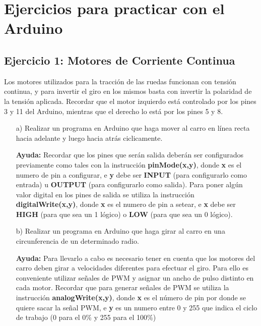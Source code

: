 \documentclass[a4paper,11pt]{article}
\begin{document}
 


\section{Ejercicios para practicar con el Arduino}

\subsection*{Ejercicio 1: Motores de Corriente Continua}Los motores utilizados para la tracción de las ruedas funcionan con tensión continua, y para invertir el giro en los mismos basta con invertir la polaridad de la tensión aplicada. Recordar que el motor izquierdo
está controlado por los pines 3 y 11 del Arduino, mientras que el derecho lo está por los pines 5 y 8.
\begin{itemize}
		\item[a) ] Realizar un programa en Arduino que haga mover al carro en línea recta hacia adelante y luego hacia atrás ciclicamente.
		
		\textbf{Ayuda:} Recordar que los pines que serán salida deberán ser configurados previamente como tales con la instrucción \textbf{pinMode(x,y)}, donde \textbf{x} es el numero de pin a configurar, e \textbf{y} debe ser \textbf{INPUT} (para configurarlo como entrada) u \textbf{OUTPUT} (para configurarlo como salida). Para poner algún valor digital en los pines de salida se utiliza la instrucción \textbf{digitalWrite(x,y)}, donde \textbf{x} es el numero de pin a setear, e \textbf{x} debe ser \textbf{HIGH} (para que sea un 1 lógico) o \textbf{LOW} (para que sea un 0 lógico).
		
		\item[b) ] Realizar un programa en Arduino que haga girar al carro en una circunferencia de un determinado radio.
		
		\textbf{Ayuda:} Para llevarlo a cabo es necesario tener en cuenta que los motores del carro deben girar a velocidades diferentes para efectuar el giro. Para ello es conveniente utilizar señales de PWM y asignar un ancho de pulso distinto en cada motor. Recordar que para generar señales de PWM se utiliza la instrucción \textbf{analogWrite(x,y)}, donde \textbf{x} es el número de pin por donde se quiere sacar la señal PWM, e \textbf{y} es un numero entre 0 y 255 que indica el ciclo de trabajo (0 para el 0\% y 255 para el 100\%) 
\end{itemize}
  
\end{document}
